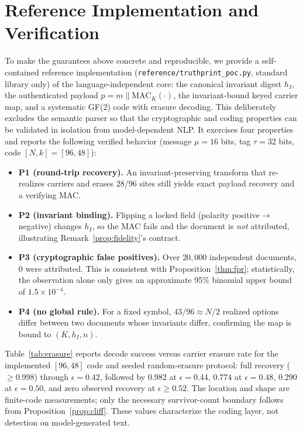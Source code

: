 \documentclass[11pt]{article}
\begin{document}
\section{Reference Implementation and Verification}
\label{sec:impl}
To make the guarantees above concrete and reproducible, we provide a self-contained reference implementation (\texttt{reference/truthprint\_poc.py}, standard library only) of the language-independent core: the canonical invariant digest $h_I$, the authenticated payload $p=m\parallel\mathrm{MAC}_K(\cdot)$, the invariant-bound keyed carrier map, and a systematic GF(2) code with erasure decoding. This deliberately excludes the semantic parser so that the cryptographic and coding properties can be validated in isolation from model-dependent NLP. It exercises four properties and reports the following verified behavior (message $\mu=16$ bits, tag $\tau=32$ bits, code $[N,k]=[96,48]$):
\begin{itemize}[leftmargin=*]
  \item \textbf{P1 (round-trip recovery).} An invariant-preserving transform that re-realizes carriers and erases $28/96$ sites still yields exact payload recovery and a verifying MAC.
  \item \textbf{P2 (invariant binding).} Flipping a locked field (polarity positive$\to$negative) changes $h_I$, so the MAC fails and the document is \emph{not} attributed, illustrating Remark~\ref{prop:fidelity}'s contract.
  \item \textbf{P3 (cryptographic false positives).} Over $20{,}000$ independent documents, $0$ were attributed. This is consistent with Proposition~\ref{thm:fpr}; statistically, the observation alone only gives an approximate 95\% binomial upper bound of $1.5\times10^{-4}$.
  \item \textbf{P4 (no global rule).} For a fixed symbol, $43/96\approx N/2$ realized options differ between two documents whose invariants differ, confirming the map is bound to $(K,h_I,n)$.
\end{itemize}
Table~\ref{tab:erasure} reports decode success versus carrier erasure rate for
the implemented $[96,48]$ code and seeded random-erasure protocol: full
recovery ($\geq0.998$) through $\epsilon=0.42$, followed by $0.982$ at
$\epsilon=0.44$, $0.774$ at $\epsilon=0.48$, $0.290$ at $\epsilon=0.50$, and
zero observed recovery at $\epsilon\geq0.52$. The location and shape are
finite-code measurements; only the necessary survivor-count boundary follows
from Proposition~\ref{prop:cliff}. These values characterize the coding layer,
not detection on model-generated text.
\end{document}
